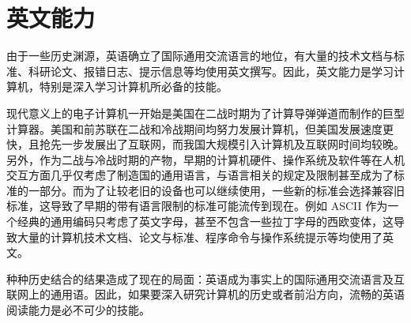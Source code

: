 \section{英文能力}\label{sec:Preclass/English}
    由于一些历史渊源，英语确立了国际通用交流语言的地位，有大量的技术文档与标准、科研论文、报错日志、提示信息等均使用英文撰写。因此，英文能力是学习计算机，特别是深入学习计算机所必备的技能。

    现代意义上的电子计算机一开始是美国在二战时期为了计算导弹弹道而制作的巨型计算器。美国和前苏联在二战和冷战期间均努力发展计算机，但美国发展速度更快，且抢先一步发展出了互联网，而我国大规模引入计算机及互联网时间均较晚。另外，作为二战与冷战时期的产物，早期的计算机硬件、操作系统及软件等在人机交互方面几乎仅考虑了制造国的通用语言，与语言相关的规定及限制甚至成为了标准的一部分。而为了让较老旧的设备也可以继续使用，一些新的标准会选择兼容旧标准，这导致了早期的带有语言限制的标准可能流传到现在。例如 ASCII 作为一个经典的通用编码只考虑了英文字母，甚至不包含一些拉丁字母的西欧变体，这导致大量的计算机技术文档、论文与标准、程序命令与操作系统提示等均使用了英文。

    种种历史结合的结果造成了现在的局面：英语成为事实上的国际通用交流语言及互联网上的通用语。因此，如果要深入研究计算机的历史或者前沿方向，流畅的英语阅读能力是必不可少的技能。

